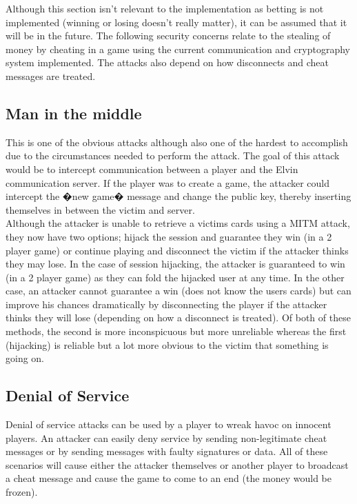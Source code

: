 \documentclass[11pt, oneside]{article}   	%
\begin{document}
Although this section isn't relevant to the implementation as betting is not implemented (winning or losing doesn't really matter), it can be assumed that it will be in the future. The following security concerns relate to the stealing of money by cheating in a game using the current communication and cryptography system implemented. The attacks also depend on how disconnects and cheat messages are treated.\\

\subsection{Man in the middle}

This is one of the obvious attacks although also one of the hardest to accomplish due to the circumstances needed to perform the attack. The goal of this attack would be to intercept communication between a player and the Elvin communication server. If the player was to create a game, the attacker could intercept the �new game� message and change the public key, thereby inserting themselves in between the victim and server.\\

Although the attacker is unable to retrieve a victims cards using a MITM attack, they now have two options; hijack the session and guarantee they win (in a 2 player game) or continue playing and disconnect the victim if the attacker thinks they may lose. In the case of session hijacking, the attacker is guaranteed to win (in a 2 player game) as they can fold the hijacked user at any time. In the other case, an attacker cannot guarantee a win (does not know the users cards) but can improve his chances dramatically by disconnecting the player if the attacker thinks they will lose (depending on how a disconnect is treated). Of both of these methods, the second is more inconspicuous but more unreliable whereas the first (hijacking) is reliable but a lot more obvious to the victim that something is going on.\\

\subsection{Denial of Service}

Denial of service attacks can be used by a player to wreak havoc on innocent players. An attacker can easily deny service by sending non-legitimate cheat messages or by sending messages with faulty signatures or data. All of these scenarios will cause either the attacker themselves or another player to broadcast a cheat message and cause the game to come to an end (the money would be frozen).\\
\end{document}
